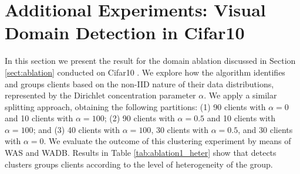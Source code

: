 \section{Additional Experiments: Visual Domain Detection in Cifar10}\label{app:cifar10}
In this section we present the result for the domain ablation discussed in Section \ref{sect:ablation} conducted on Cifar10 \cite{krizhevsky2009learning}. We explore how the algorithm identifies and groups clients based on the non-IID nature of their data distributions, represented by the Dirichlet concentration parameter $\alpha$. We apply a similar splitting approach, obtaining the following partitions: (1) 90 clients with $\alpha = 0$ and 10 clients with $\alpha = 100$; (2) 90 clients with $\alpha = 0.5$ and 10 clients with $\alpha = 100$; and (3) 40 clients with $\alpha = 100$, 30 clients with $\alpha = 0.5$, and 30 clients with $\alpha = 0$. We evaluate the outcome of this clustering experiment by means of WAS and WADB. Results in Table \ref{tab:ablation1_heter} show that \shortname detects clusters groups clients according to the level of heterogeneity of the group.
